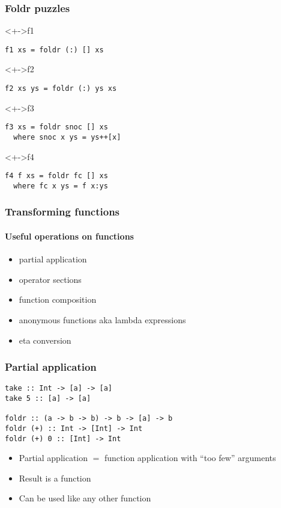 \documentclass{beamer}
\begin{document}
\begin{frame}[fragile]
  \frametitle{Foldr puzzles}
  \begin{block}<+->{f1}
\begin{verbatim}
f1 xs = foldr (:) [] xs
\end{verbatim}
  \end{block}
  \begin{block}<+->{f2}
\begin{verbatim}
f2 xs ys = foldr (:) ys xs
\end{verbatim}
  \end{block}
  \begin{block}<+->{f3}
\begin{verbatim}
f3 xs = foldr snoc [] xs
  where snoc x ys = ys++[x]
\end{verbatim}
  \end{block}
  \begin{block}<+->{f4}
\begin{verbatim}
f4 f xs = foldr fc [] xs
  where fc x ys = f x:ys
\end{verbatim}
  \end{block}
\end{frame}
\begin{frame}
  \frametitle{Transforming functions}
  \framesubtitle{Useful operations on functions}
  \begin{itemize}
  \item partial application
  \item operator sections
  \item function composition
  \item anonymous functions aka lambda expressions
  \item eta conversion
  \end{itemize}
\end{frame}
\begin{frame}[fragile]
  \frametitle{Partial application}
\begin{verbatim}
take :: Int -> [a] -> [a]
take 5 :: [a] -> [a]

foldr :: (a -> b -> b) -> b -> [a] -> b
foldr (+) :: Int -> [Int] -> Int
foldr (+) 0 :: [Int] -> Int
\end{verbatim}
  \begin{itemize}
  \item Partial application $=$ function application with ``too few'' arguments
  \item Result is a function
  \item Can be used like any other function
  \end{itemize}
\end{frame}
\end{document}
